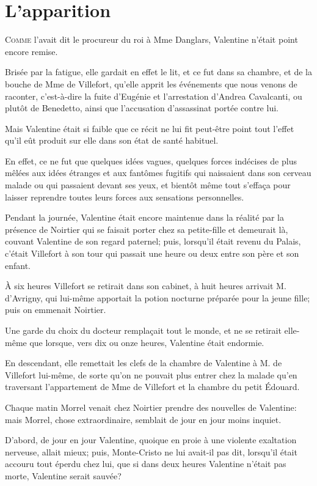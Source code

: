 \chapter{L'apparition}

\lettrine{C}{omme} l'avait dit le procureur du roi à Mme Danglars, Valentine n'était point encore remise. 

\zz
Brisée par la fatigue, elle gardait en effet le lit, et ce fut dans sa chambre, et de la bouche de Mme de Villefort, qu'elle apprit les événements que nous venons de raconter, c'est-à-dire la fuite d'Eugénie et l'arrestation d'Andrea Cavalcanti, ou plutôt de Benedetto, ainsi que l'accusation d'assassinat portée contre lui. 

Mais Valentine était si faible que ce récit ne lui fit peut-être point tout l'effet qu'il eût produit sur elle dans son état de santé habituel. 

En effet, ce ne fut que quelques idées vagues, quelques forces indécises de plus mêlées aux idées étranges et aux fantômes fugitifs qui naissaient dans son cerveau malade ou qui passaient devant ses yeux, et bientôt même tout s'effaça pour laisser reprendre toutes leurs forces aux sensations personnelles. 

Pendant la journée, Valentine était encore maintenue dans la réalité par la présence de Noirtier qui se faisait porter chez sa petite-fille et demeurait là, couvant Valentine de son regard paternel; puis, lorsqu'il était revenu du Palais, c'était Villefort à son tour qui passait une heure ou deux entre son père et son enfant. 

À six heures Villefort se retirait dans son cabinet, à huit heures arrivait M. d'Avrigny, qui lui-même apportait la potion nocturne préparée pour la jeune fille; puis on emmenait Noirtier. 

Une garde du choix du docteur remplaçait tout le monde, et ne se retirait elle-même que lorsque, vers dix ou onze heures, Valentine était endormie. 

En descendant, elle remettait les clefs de la chambre de Valentine à M. de Villefort lui-même, de sorte qu'on ne pouvait plus entrer chez la malade qu'en traversant l'appartement de Mme de Villefort et la chambre du petit Édouard. 

Chaque matin Morrel venait chez Noirtier prendre des nouvelles de Valentine: mais Morrel, chose extraordinaire, semblait de jour en jour moins inquiet. 

D'abord, de jour en jour Valentine, quoique en proie à une violente exaltation nerveuse, allait mieux; puis, Monte-Cristo ne lui avait-il pas dit, lorsqu'il était accouru tout éperdu chez lui, que si dans deux heures Valentine n'était pas morte, Valentine serait sauvée? 

